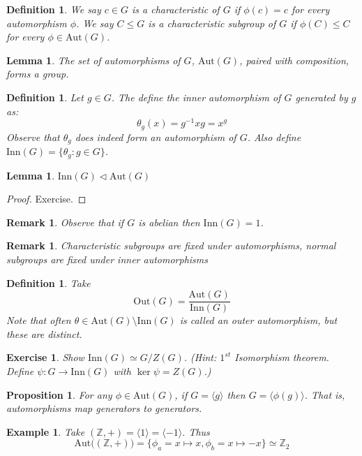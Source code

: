 \documentclass[a4paper,10pt]{article}
\newcommand{\ZZ}{\mathbb{Z}}
\newtheorem{Def}[thm]{Definition}
\newtheorem{prop}[thm]{Proposition}
\newtheorem{eg}[thm]{Example}
\newtheorem{Ex}[thm]{Exercise}
\newtheorem{Lem}[thm]{Lemma}
\newtheorem{rem}[thm]{Remark}
\begin{document}
\begin{Def}
We say $c \in G$ is a characteristic of $G$ if $\phi (c) = c$ for every automorphism $\phi$. We say $C \leq G$ is a characteristic subgroup of $G$ if $\phi(C) \leq C$ for every $\phi \in \text{Aut}(G)$. 
\end{Def}
\begin{Lem}
The set of automorphisms of $G$, $\text{Aut}(G)$,  paired with composition, forms a group.
\end{Lem}
\begin{Def}
Let $g \in G$. The define the inner automorphism of $G$ generated by $g$ as:
\[ \theta_g(x) = g^{-1} x g = x^g \]
Observe that $\theta_g$ does indeed form an automorphism of $G$. Also define $\text{Inn} (G) = \{\theta_g : g \in G \}$. 
\end{Def}
\begin{Lem}
$\text{Inn}(G) \triangleleft \text{Aut}(G)$
\end{Lem}
\begin{proof}
Exercise.
\end{proof}
\begin{rem}
Observe that if $G$ is abelian then $\text{Inn}(G) = 1$. 
\end{rem}
\begin{rem}
Characteristic subgroups are fixed under automorphisms, normal subgroups are fixed under inner automorphisms
\end{rem}
\begin{Def}
Take 
\[ \text{Out} (G) = \frac{\text{Aut}(G)}{\text{Inn}(G)} \]
Note that often $\theta \in \text{Aut}(G) \setminus \text{Inn}(G)$ is called an outer automorphism, but these are distinct. 
\end{Def}
\begin{Ex}
Show $\text{Inn}(G) \simeq G / Z(G)$. (Hint: $1^{st}$ Isomorphism theorem. Define $\psi : G \rightarrow \text{Inn}(G)$ with $\ker \psi = Z(G)$.)
\end{Ex}
\begin{prop}
For any $\phi \in \text{Aut}(G)$, if $G = \langle g \rangle$ then $G = \langle \phi(g) \rangle$. That is, automorphisms map generators to generators. 
\end{prop}

\begin{eg}
Take $(\ZZ, +) = \langle 1 \rangle = \langle -1 \rangle$. Thus 
\[ \text{Aut} \big( (\ZZ, +) \big) = \{ \phi_a = x \mapsto x, \phi_b = x \mapsto -x\} \simeq \ZZ_2 \]
\end{eg}
\end{document}
